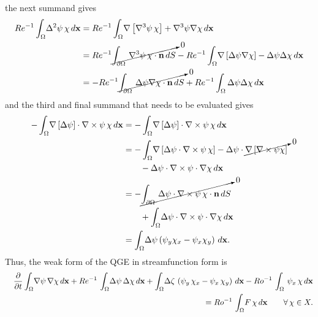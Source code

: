 the next summand gives
\begin{align*}
  Re^{-1}\int_{\Omega}\! \Delta^2 \psi\, \chi \,d\mathbf{x} &= Re^{-1}\int_{\Omega}\! \nabla\left[
    \nabla^3 \psi \, \chi \right] + \nabla^3 \psi \nabla \chi \,d\mathbf{x} \\
  &= Re^{-1}\cancelto{0}{\int_{\partial\Omega}\, \nabla^3 \psi\, \chi\cdot \mathbf{n}
    \,dS} - Re^{-1}\int_{\Omega}\! \nabla\left[ \Delta\psi \nabla \chi \right] - \Delta
    \psi \Delta \chi \,d\mathbf{x} \\
  &= -Re^{-1} \cancelto{0}{\int_{\partial\Omega}\, \Delta\psi \nabla \chi \cdot
    \mathbf{n}\, dS} + Re^{-1} \int_{\Omega} \Delta \psi \Delta \chi \,d\mathbf{x}
\end{align*}
and the third and final summand that needs to be evaluated gives 
\begin{align*}
  -\int_{\Omega}\! \nabla\left[ \Delta\psi\right]\cdot
    \nabla\times\psi \, \chi \,d\mathbf{x} &= -\int_{\Omega}\!
    \nabla\left[\Delta\psi\right]\cdot \nabla\times\psi \, \chi\, d\mathbf{x}\\
  &= -\int_{\Omega}\! \nabla\left[ \Delta\psi \cdot \nabla\times\psi\, \chi
    \right] -\Delta\psi\cdot \cancelto{0}{\nabla\left[ \nabla\times\psi \chi
    \right]} \\ 
      &\qquad - \Delta\psi\cdot \nabla\times\psi \cdot \nabla\chi \,d\mathbf{x} \\
  &= -\cancelto{0}{\int_{\partial\Omega}\, \Delta\psi \cdot \nabla\times\psi\, \chi
    \cdot \mathbf{n} \,dS} \\
    &\qquad + \int_{\Omega}\! \Delta \psi \cdot \nabla\times \psi \cdot
      \nabla \chi \,d\mathbf{x} \\ 
  &= \int_{\Omega}\! \Delta\psi\left( \psi_y\chi_x - \psi_x\chi_y \right)\, d\mathbf{x}.
\end{align*}
Thus, the weak form of the QGE in streamfunction form is
\begin{eqnarray}
  && \frac{\partial}{\partial t} \int_{\Omega}\! \nabla \psi\, \nabla \chi  \,d\mathbf{x} 
    + Re^{-1} \, \int_{\Omega}\! \Delta \psi \, \Delta \chi \, d{\bf x} + \int_{\Omega}\! \Delta
    \zeta \, \left( \psi_y \, \chi_x - \psi_x \, \chi_y \right)\, d{\bf x} - Ro^{-1} \, \int_{\Omega}
    \, \psi_x \, \chi \, d{\bf x} \nonumber \\ 
  && \hspace*{3.0cm} = Ro^{-1}\, \int_{\Omega}\! F \, \chi \, d{\bf x} \qquad \forall \, \chi \in X .
\label{eqn:qge_psi_weak}
\end{eqnarray}
